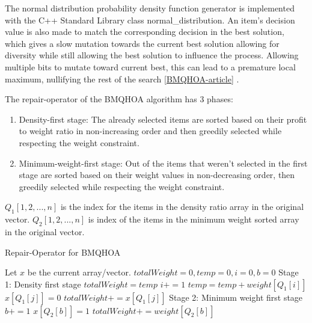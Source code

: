 \documentclass[titlepage]{article}
\begin{document}
The normal distribution probability density function generator is implemented with the C++ Standard Library class normal\_distribution. An item's decision value is also made to match the corresponding decision in the best solution, which gives a slow mutation towards the current best solution allowing for diversity while still allowing the best solution to influence the process. Allowing multiple bits to mutate toward current best, this can lead to a premature local maximum, nullifying the rest of the search \ref{BMQHOA-article} . 

The repair-operator of the BMQHOA algorithm has 3 phases:
\begin{enumerate}
    \item Density-first stage: The already selected items are sorted based on their profit to weight ratio in non-increasing order and then greedily selected while respecting the weight constraint. 
    \item Minimum-weight-first stage: Out of the items that weren't selected in the first stage are sorted based on their weight values in non-decreasing order, then greedily selected while respecting the weight constraint.   
\end{enumerate}

$Q_{1}[1, 2,...,n]$ is the index for the items in the density ratio array in the original vector. $Q_{2}[1, 2,..., n]$ is index of the items in the minimum weight sorted array in the original vector.

\begin{breakablealgorithm}
\caption{Repair-Operator for BMQHOA}\label{harmonicRepair}
    \begin{algorithmic}
        \State Let $x$ be the current array/vector.
        \State $totalWeight = 0, temp = 0, i = 0, b = 0$
        \State Stage 1: Density first stage
            \State $totalWeight = temp$
            \State $i += 1$
            \State $temp = temp + weight[Q_{1}[i]]$
        \EndWhile
            \State $x[Q_{1}[j]] = 0$
            \State $totalWeight += x[Q_{1}[j]]$
        \EndFor
        \State Stage 2: Minimum weight first stage
            \State $b += 1$
                    \State $x[Q_{2}[b]] = 1$
                \State $totalWeight += weight[Q_{2}[b]]$
            \EndIf
        \EndWhile
    \end{algorithmic}
\end{breakablealgorithm}
\end{document}

